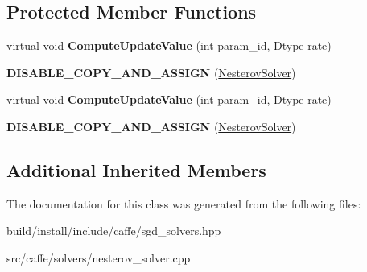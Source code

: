 \subsection*{Protected Member Functions}
\begin{DoxyCompactItemize}
\item 
\mbox{\label{classcaffe_1_1_nesterov_solver_ac626ccf5a7edfd8dbde70b2ee513c9e7}} 
virtual void {\bfseries Compute\+Update\+Value} (int param\+\_\+id, Dtype rate)
\item 
\mbox{\label{classcaffe_1_1_nesterov_solver_a8ad4901ffc73049b2dc5bc7d3789b7dc}} 
{\bfseries D\+I\+S\+A\+B\+L\+E\+\_\+\+C\+O\+P\+Y\+\_\+\+A\+N\+D\+\_\+\+A\+S\+S\+I\+GN} (\mbox{\hyperlink{classcaffe_1_1_nesterov_solver}{Nesterov\+Solver}})
\item 
\mbox{\label{classcaffe_1_1_nesterov_solver_a791a49b5b652cd8eda463e21e2e07b01}} 
virtual void {\bfseries Compute\+Update\+Value} (int param\+\_\+id, Dtype rate)
\item 
\mbox{\label{classcaffe_1_1_nesterov_solver_a8ad4901ffc73049b2dc5bc7d3789b7dc}} 
{\bfseries D\+I\+S\+A\+B\+L\+E\+\_\+\+C\+O\+P\+Y\+\_\+\+A\+N\+D\+\_\+\+A\+S\+S\+I\+GN} (\mbox{\hyperlink{classcaffe_1_1_nesterov_solver}{Nesterov\+Solver}})
\end{DoxyCompactItemize}
\subsection*{Additional Inherited Members}


The documentation for this class was generated from the following files\+:\begin{DoxyCompactItemize}
\item 
build/install/include/caffe/sgd\+\_\+solvers.\+hpp\item 
src/caffe/solvers/nesterov\+\_\+solver.\+cpp\end{DoxyCompactItemize}
